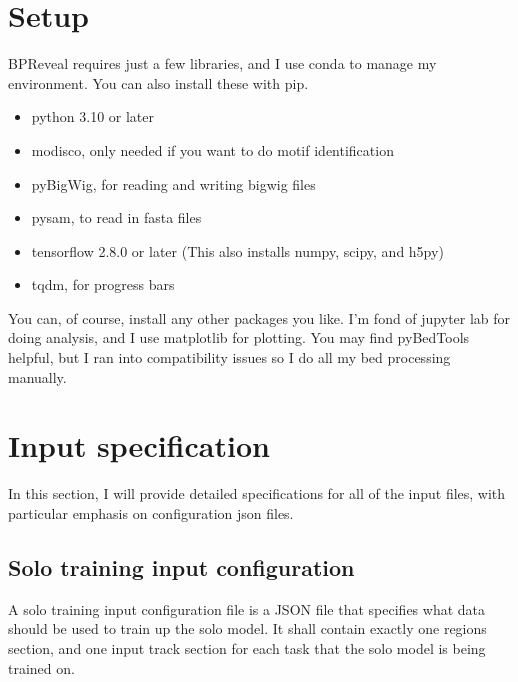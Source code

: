 \documentclass{article}
\begin{document}
\section{Setup}
BPReveal requires just a few libraries, and I use conda to manage my environment. You can also install these with pip. 
\begin{itemize}
    \item python 3.10 or later
    \item modisco, only needed if you want to do motif identification
    \item pyBigWig, for reading and writing bigwig files
    \item pysam, to read in fasta files
    \item tensorflow 2.8.0 or later (This also installs numpy, scipy, and h5py)
    \item tqdm, for progress bars
\end{itemize}

You can, of course, install any other packages you like. 
I'm fond of jupyter lab for doing analysis, and I use matplotlib for plotting. 
You may find pyBedTools helpful, but I ran into compatibility issues so I do all my bed processing manually. 





\section{Input specification}
In this section, I will provide detailed specifications for all of the input files, with particular emphasis on configuration json files.

\subsection{Solo training input configuration}
A solo training input configuration file is a JSON file that specifies what data should be used to train up the solo model.
It shall contain exactly one regions section, and one input track section for each task that the solo model is being trained on. 
\end{document}
